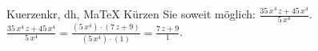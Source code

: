 \begin{MAufgabe}{Kuerzen}{kr, dh, MaTeX}
K\"urzen Sie soweit m\"oglich: $\frac{35\, x^4\, z + 45\, x^4}{5\, x^4}$.\\ 
\ifLsg\MLoesung
\quad $\frac{35\, x^4\, z + 45\, x^4}{5\, x^4}=\frac{(5\, x^4)\cdot(7\, z + 9)}{(5\, x^4)\cdot(1)}=\frac{7\, z + 9}{1}$.\else\relax\fi
 \end{MAufgabe}